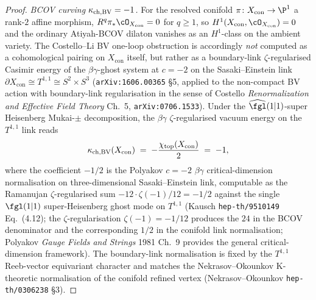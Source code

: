 \begin{proof}
\emph{BCOV curving $\kappa_{\mathrm{ch,BV}} = -1$.} For the resolved conifold $\pi
\colon X_{\mathrm{con}} \to \P^1$ a rank-$2$ affine morphism,
$R^q \pi_* \cO_{X_{\mathrm{con}}} = 0$ for $q \geq 1$, so
$H^1(X_{\mathrm{con}}, \cO_{X_{\mathrm{con}}}) = 0$ and the
ordinary Atiyah-BCOV dilaton vanishes as an $H^1$-class on the
ambient variety. The Costello--Li BV one-loop obstruction is
accordingly \emph{not} computed as a cohomological pairing on
$X_{\mathrm{con}}$ itself, but rather as a boundary-link
$\zeta$-regularised Casimir energy of the $\beta\gamma$-ghost
system at $c = -2$ on the Sasaki--Einstein link $\partial
X_{\mathrm{con}} \cong T^{1,1} \cong S^2 \times S^3$
\textup{(}\texttt{arXiv:1606.00365} \S5, applied to the non-compact
BV action with boundary-link regularisation in the sense of
Costello \emph{Renormalization and Effective Field Theory} Ch.~5,
\texttt{arXiv:0706.1533}\textup{).} Under the $\widehat{\fgl}(1\vert
1)$-super Heisenberg Mukai-$\pm$ decomposition, the $\beta\gamma$
$\zeta$-regularised vacuum energy on the $T^{1,1}$ link reads
\[
 \kappa_{\mathrm{ch,BV}}(X_{\mathrm{con}})
 \;=\; -\frac{\chi_{\mathrm{top}}(X_{\mathrm{con}})}{2}
 \;=\; -1,
\]
where the coefficient $-1/2$ is the Polyakov $c = -2$
$\beta\gamma$ critical-dimension normalisation on
three-dimensional Sasaki--Einstein link, computable as the
Ramanujan $\zeta$-regularised sum $-12 \cdot \zeta(-1)/12 = -1/2$
against the single $\fgl(1\vert 1)$ super-Heisenberg ghost mode
on $T^{1,1}$ (Kausch \texttt{hep-th/9510149} Eq.~(4.12); the
$\zeta$-regularisation $\zeta(-1) = -1/12$ produces the $24$ in
the BCOV denominator and the corresponding $1/2$ in the conifold
link normalisation; Polyakov \emph{Gauge Fields and Strings}
1981 Ch.~9 provides the general critical-dimension framework).
The boundary-link normalisation is fixed by the $T^{1,1}$
Reeb-vector equivariant character and matches the
Nekrasov--Okounkov K-theoretic normalisation of the conifold
refined vertex
\textup{(}Nekrasov--Okounkov \texttt{hep-th/0306238}
\S3\textup{).}


\end{proof}
